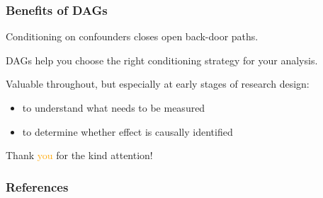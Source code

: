 \documentclass[12pt,english,dvipsnames,aspectratio=169,handout]{beamer}
\begin{document}
\begin{frame}
	\frametitle{Benefits of DAGs}
	Conditioning on confounders closes open back-door paths.\bigskip
	
	\pause
	
	DAGs help you choose the right conditioning strategy for your analysis.\bigskip
	
	\pause
	
	Valuable throughout, but especially at early stages of research design:
	
	\begin{itemize}
		\item to understand what needs to be measured
		
		\pause
		
		\item to determine whether effect is causally identified
	\end{itemize}
	
\end{frame}


\begin{frame}
\begin{center}
    \Huge Thank \textcolor{orange}{you} for the kind attention!
\end{center}
\end{frame}


\begin{frame}
\frametitle{References}


\vspace{5cm}
\end{frame}
\end{document}
